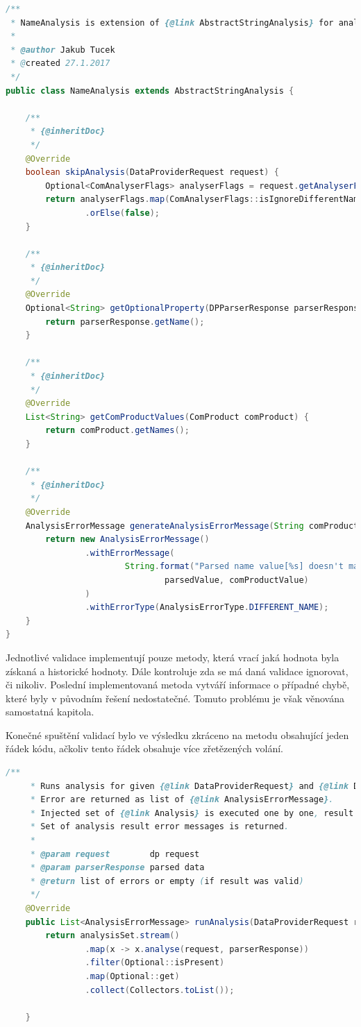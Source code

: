 \documentclass[thesis=B,czech]{FITthesis}[2012/06/26]
\begin{document}
\begin{lstlisting}[language=Java, caption={Validace kontrolující hodnotu získaného jména produktu}]
/**
 * NameAnalysis is extension of {@link AbstractStringAnalysis} for analysing Name.
 *
 * @author Jakub Tucek
 * @created 27.1.2017
 */
public class NameAnalysis extends AbstractStringAnalysis {

    /**
     * {@inheritDoc}
     */
    @Override
    boolean skipAnalysis(DataProviderRequest request) {
        Optional<ComAnalyserFlags> analyserFlags = request.getAnalyserFlags();
        return analyserFlags.map(ComAnalyserFlags::isIgnoreDifferentName)
                .orElse(false);
    }

    /**
     * {@inheritDoc}
     */
    @Override
    Optional<String> getOptionalProperty(DPParserResponse parserResponse) {
        return parserResponse.getName();
    }

    /**
     * {@inheritDoc}
     */
    @Override
    List<String> getComProductValues(ComProduct comProduct) {
        return comProduct.getNames();
    }

    /**
     * {@inheritDoc}
     */
    @Override
    AnalysisErrorMessage generateAnalysisErrorMessage(String comProductValue, String parsedValue) {
        return new AnalysisErrorMessage()
                .withErrorMessage(
                        String.format("Parsed name value[%s] doesn't match known name value[%s]",
                                parsedValue, comProductValue)
                )
                .withErrorType(AnalysisErrorType.DIFFERENT_NAME);
    }
}
\end{lstlisting}
Jednotlivé validace implementují pouze metody, která vrací jaká hodnota byla získaná a historické hodnoty. Dále kontroluje zda
se má daná validace ignorovat, či nikoliv. Poslední implementovaná metoda vytváří informace o případné chybě, které byly
v původním řešení nedostatečné. Tomuto problému je však věnována samostatná kapitola.
\par
Konečné spuštění validací bylo ve výsledku zkráceno na metodu obsahující jeden řádek kódu, ačkoliv tento řádek
obsahuje více zřetězených volání.
\par
\begin{lstlisting}[language=Java, caption={Upravená implementace hlavní metody ve třídě zajišťující spouštění validací analyzátoru}]
    /**
     * Runs analysis for given {@link DataProviderRequest} and {@link DPParserResponse}.
     * Error are returned as list of {@link AnalysisErrorMessage}.
     * Injected set of {@link Analysis} is executed one by one, result unwrapped and kept if present.
     * Set of analysis result error messages is returned.
     *
     * @param request        dp request
     * @param parserResponse parsed data
     * @return list of errors or empty (if result was valid)
     */
    @Override
    public List<AnalysisErrorMessage> runAnalysis(DataProviderRequest request, DPParserResponse parserResponse) {
        return analysisSet.stream()
                .map(x -> x.analyse(request, parserResponse))
                .filter(Optional::isPresent)
                .map(Optional::get)
                .collect(Collectors.toList());

    }
\end{lstlisting}
\end{document}
